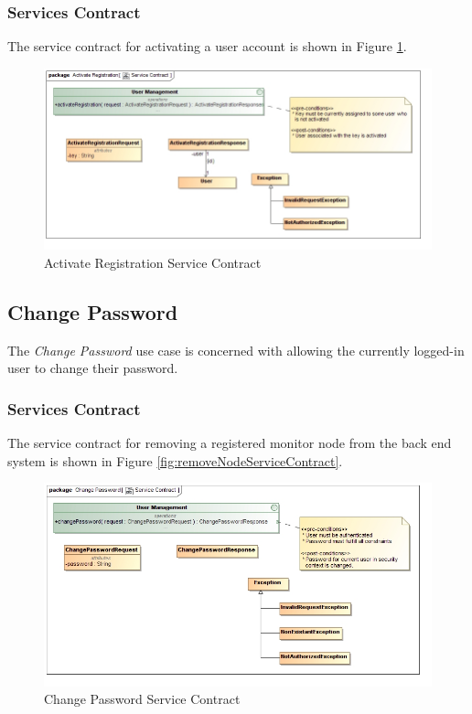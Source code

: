 \subsubsection{Services Contract}
The service contract for activating a user account is shown in 
Figure \ref{fig:activateRegistrationServiceContract}.
\begin{figure}[H]
	\begin{center}
		\includegraphics[scale=0.4]{../Diagrams and Charts/User Management/Activate Registration Service Contract.jpg}
		\caption{Activate Registration Service Contract}
		\label{fig:activateRegistrationServiceContract}
	\end{center}
\end{figure}
 


\subsection{Change Password}
The \textit{Change Password} use case is concerned with allowing the currently
logged-in user to change their password.

\subsubsection{Services Contract}
The service contract for removing a registered monitor node from the back end 
system is shown in Figure \ref{fig:removeNodeServiceContract}.
\begin{figure}[H]
  \begin{center}
  \includegraphics[scale=0.4]{../Diagrams and Charts/User Management/Change Password Service Contract.jpg}
  \caption{Change Password Service Contract}
  \label{fig:changePasswordServicesContract}
  \end{center}
\end{figure}



